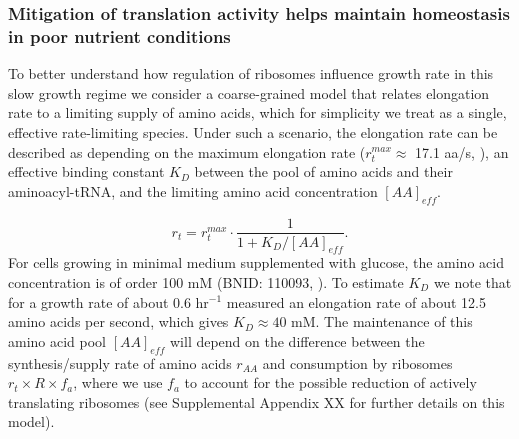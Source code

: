 \subsubsection{Mitigation of translation activity helps maintain homeostasis in
poor nutrient conditions}

To better understand how regulation of ribosomes influence growth rate in this
slow growth regime we consider a coarse-grained model that relates elongation
rate to a limiting supply of amino acids, which for simplicity we treat as a
single, effective rate-limiting species. Under such a scenario, the elongation
rate can be described as depending on the maximum elongation rate
($r_t^{max} \approx$ 17.1 aa/s, \citep{dai2016, dai2018}), an effective binding
constant $K_D$ between the pool of amino acids and their aminoacyl-tRNA, and the limiting amino acid concentration $[AA]_{eff}$.

\begin{equation}
r_t = r_t^{max} \cdot \frac{1}{1 + K_D / [AA]_{eff}}.
\label{eq:rate_Kd}
\end{equation}
For cells growing in minimal medium supplemented with glucose, the amino acid
concentration is of order 100 mM (BNID: 110093, \citep{milo2010, bennett2009}).
To estimate  $K_D$ we note that for a growth rate of about 0.6 hr$^{-1}$
\cite{dai2016} measured an elongation rate of about 12.5 amino acids per second,
which gives $K_D \approx 40$ mM. The maintenance of this amino acid pool
$[AA]_{eff}$ will depend on the difference between the synthesis/supply rate of
amino acids $r_{AA}$ and consumption by ribosomes $r_t \times R \times f_a$,
where we use $f_a$ to account for the possible reduction of actively translating
ribosomes (see Supplemental Appendix XX for further details on this model).

